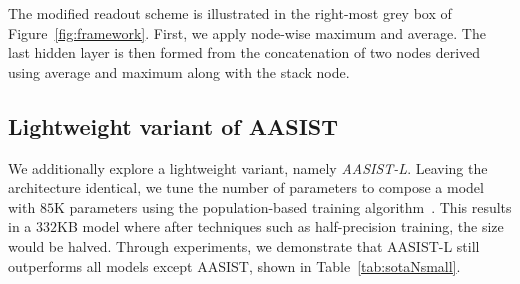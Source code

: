 \documentclass{article}
\begin{document}
The modified readout scheme is illustrated in the right-most grey box of Figure~\ref{fig:framework}.
First, we apply node-wise maximum and average. 
The last hidden layer is then formed from the concatenation of two nodes derived using average and maximum along with the stack node. 

\subsection{Lightweight variant of AASIST}
\label{ssec:smallModel}
We additionally explore a lightweight variant, namely {\em AASIST-L}. 
Leaving the architecture identical, we tune the number of parameters to compose a model with $85$K parameters using the population-based training algorithm~\cite{jaderberg2017population}. 
This results in a $332$KB model where after techniques such as half-precision training, the size would be halved.
Through experiments, we demonstrate that AASIST-L still outperforms all models except AASIST, shown in Table~\ref{tab:sotaNsmall}. 
\end{document}
